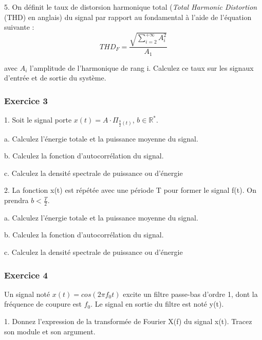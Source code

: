 	5. On définit le taux de distorsion harmonique total (\textit{Total Harmonic Distortion} (THD) en anglais) du signal par rapport au fondamental à l'aide de l'équation suivante :
	\begin{equation*}
	THD_{F}=\frac{\sqrt{\sum_{i=2}^{+\infty}A_{i}^{2}}}{A_{1}}
	\end{equation*}
	
	avec  $A_{i}$ l'amplitude de l'harmonique de rang i. Calculez ce taux sur les signaux d'entrée et de sortie du système.
	
	\vspace{1\baselineskip}
	
	
	\subsubsection{Exercice 3}
	
	1. Soit le signal porte $x(t)=A\cdot \Pi_{\frac{b}{2}(t)}$, $b\in \mathbb{R^{*}}$.
	
	a. Calculez l'énergie totale et la puissance moyenne du signal.
	
	b. Calculez la fonction d'autocorrélation du signal.
	
	c. Calculez la densité spectrale de puissance ou d'énergie
	
	\vspace{0.5\baselineskip}
	
	2. La fonction x(t) est répétée avec une période T pour former le signal f(t). On prendra $b<\frac{T}{2}$.
	
	a. Calculez l'énergie totale et la puissance moyenne du signal.
	
	b. Calculez la fonction d'autocorrélation du signal.
	
	c. Calculez la densité spectrale de puissance ou d'énergie
	
	\vspace{1\baselineskip}
	
	\subsubsection{Exercice 4}
	
	Un signal noté $x(t)=cos(2\pi f_{0}t)$ excite un filtre passe-bas d'ordre 1, dont la fréquence de coupure est $f_{0}$. Le signal en sortie du filtre est noté y(t).
	
	\vspace{0.5\baselineskip}	
	
	1. Donnez l'expression de la transformée de Fourier X(f) du signal x(t). Tracez son module et son argument.
	
